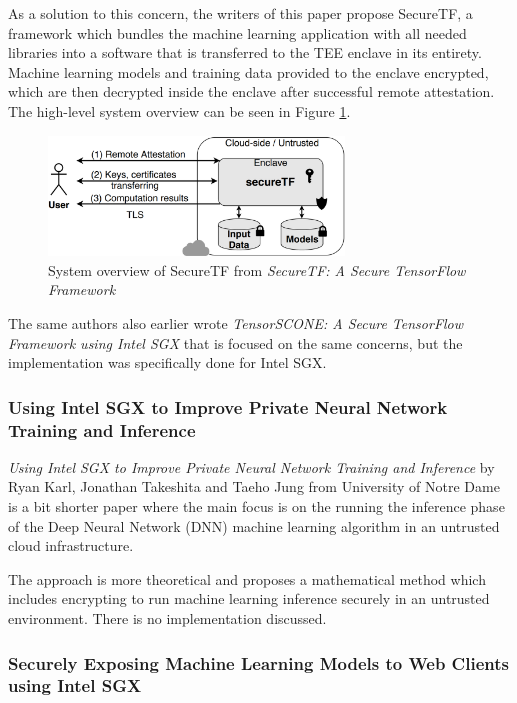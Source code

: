 As a solution to this concern, the writers of this paper propose SecureTF, a framework which bundles the machine learning application with all needed libraries into a software that is transferred to the TEE enclave in its entirety. Machine learning models and training data provided to the enclave encrypted, which are then decrypted inside the enclave after successful remote attestation. The high-level system overview can be seen in Figure \ref{img:securetf}.

\begin{figure}
\centering \includegraphics[width=0.7\textwidth]{img/securetf}
\caption{System overview of SecureTF from \textit{SecureTF: A Secure TensorFlow Framework}}
\label{img:securetf} 
\end{figure}

The same authors also earlier wrote \textit{TensorSCONE: A Secure TensorFlow Framework using Intel SGX}\cite{tensorscone} that is focused on the same concerns, but the implementation was specifically done for Intel SGX.

\subsubsection{Using Intel SGX to Improve Private Neural Network Training and Inference} \label{improveprivate}

\textit{Using Intel SGX to Improve Private Neural Network Training and Inference} by Ryan Karl, Jonathan Takeshita and Taeho Jung from University of Notre Dame is a bit shorter paper where the main focus is on the running the inference phase of the Deep Neural Network (DNN) machine learning algorithm in an untrusted cloud infrastructure.

The approach is more theoretical and proposes a mathematical method which includes encrypting to run machine learning inference securely in an untrusted environment. There is no implementation discussed.

\subsubsection{Securely Exposing Machine Learning Models to Web Clients using Intel SGX} \label{securelyexposingml}
 
